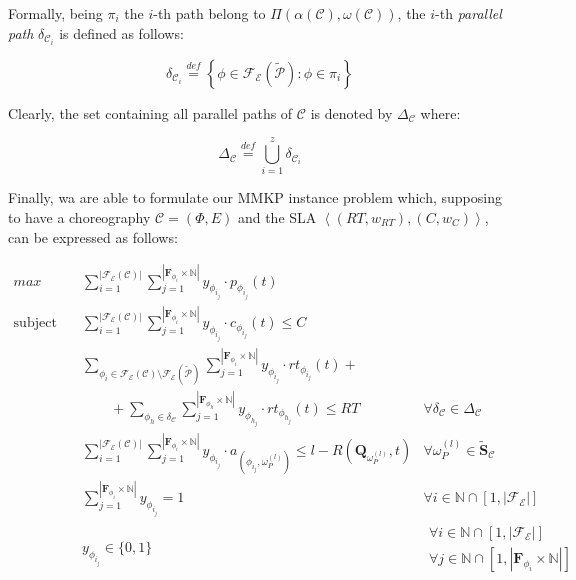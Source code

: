 \documentclass[12pt,a4paper]{report}
\newcommand{\mathDef}{\overset{\textit{def}}{=}}
\newcommand{\N}{\mathbb{N}}
\begin{document}
Formally, being $\pi_i$ the $i$-th path belong to $\Pi(\alpha(\mathcal{C}),\omega(\mathcal{C}))$, the $i$-th \textit{parallel path} $\delta_{\mathcal{C}_i}$ is defined as follows:

\begin{equation}
	\delta_{\mathcal{C}_i} \mathDef \left\{ \phi \in \mathscr{F_E}(\mathcal{\widetilde{P}}) : \phi \in \pi_i \right\}
\end{equation}

Clearly, the set containing all parallel paths of $\mathcal{C}$ is denoted by $\Delta_{\mathcal{C}}$ where: 

\begin{equation}
	\Delta_{\mathcal{C}} \mathDef \bigcup_{i=1}^z \delta_{\mathcal{C}_i}
\end{equation}

Finally, wa are able to formulate our MMKP instance problem which, supposing to have a choreography $\mathcal{C} = (\Phi,E)$ and the SLA $\left\langle (RT,w_{RT}),(C,w_{C}) \right\rangle$, can be expressed as follows:

\begin{align}
	\displaystyle max \quad & \displaystyle \sum_{i = 1}^{|\mathscr{F_E}(\mathcal{C})|}  \sum_{j = 1}^{|\textbf{F}_{\phi_{i}} \times \N|} y_{\phi_{i_{j}}} \cdot p_{\phi_{i_{j}}}(t) & \label{MMPKObjective}\\	
	\text{subject to} \quad  & \displaystyle \sum_{i = 1}^{|\mathscr{F_E}(\mathcal{C})|}  \sum_{j = 1}^{|\textbf{F}_{\phi_{i}} \times \N|} y_{\phi_{i_{j}}} \cdot c_{\phi_{i_{j}}}(t) \leq C & \label{MMPKCost} \\
	& \displaystyle \sum_{\phi_i \in \mathscr{F_E}(\mathcal{C}) \setminus \mathscr{F_E}(\mathcal{\widetilde{P}})}  \sum_{j = 1}^{|\textbf{F}_{\phi_{i}} \times \N|} y_{\phi_{i_{j}}} \cdot rt_{\phi_{i_{j}}}(t) + \nonumber \\
	& \qquad + \sum_{\phi_h \in \delta_{\mathcal{C}}}  \sum_{j = 1}^{|\textbf{F}_{\phi_{h}} \times \N|} y_{\phi_{h_{j}}} \cdot rt_{\phi_{h_{j}}}(t) \leq RT \label{MMPKDelay} & 
	\forall \delta_{\mathcal{C}} \in \Delta_{\mathcal{C}} \\	
	& \displaystyle \sum_{i = 1}^{|\mathscr{F_E}(\mathcal{C})|}  \sum_{j = 1}^{|\textbf{F}_{\phi_{i}} \times \N|} y_{\phi_{i_{j}}} \cdot a_{(\phi_{i_{j}},\omega_{P}^{(l)})} \leq l - R(\textbf{Q}_{\omega_{P}^{(l)}}, t) &  \forall \omega_{P}^{(l)} \in \widetilde{\textbf{S}}_{\mathcal{C}} \label{MMPKCapacity} \\
	& \displaystyle \sum_{j = 1}^{|\textbf{F}_{\phi_{i}} \times \N|} y_{\phi_{i_{j}}} = 1 & \forall i \in \N \cap \left[ 1, |\mathscr{F_E}| \right] \label{MMPKOvvio} \\
	& y_{\phi_{i_{j}}} \in \lbrace 0, 1 \rbrace &
	\begin{array}{r}
		\forall i \in \N \cap \left[ 1, |\mathscr{F_E}| \right] \\ \forall j \in \N \cap [1,|\textbf{F}_{\phi_{i}} \times \N|] \label{MMPKOvvio2}
	\end{array}
\end{align}
\end{document}
